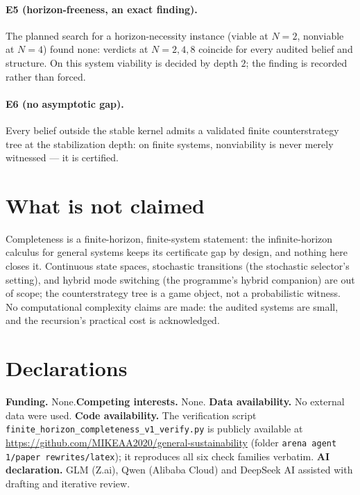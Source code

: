 \documentclass[10pt,twocolumn]{article}
\theoremstyle{definition}
\begin{document}
\paragraph{E5 (horizon-freeness, an exact finding).} The planned search for
a horizon-necessity instance (viable at $N=2$, nonviable at $N=4$) found
none: verdicts at $N=2,4,8$ coincide for every audited belief and
structure. On this system viability is decided by depth $2$; the finding
is recorded rather than forced.

\paragraph{E6 (no asymptotic gap).} Every belief outside the stable kernel
admits a validated finite counterstrategy tree at the stabilization depth:
on finite systems, nonviability is never merely witnessed --- it is
certified.

\section{What is not claimed}

Completeness is a finite-horizon, finite-system statement: the
infinite-horizon calculus for general systems keeps its certificate gap by
design, and nothing here closes it. Continuous state spaces, stochastic
transitions (the stochastic selector's setting), and hybrid mode switching
(the programme's hybrid companion) are out of scope; the counterstrategy
tree is a game object, not a probabilistic witness. No computational
complexity claims are made: the audited systems are small, and the
recursion's practical cost is acknowledged.


\section*{Declarations}
\textbf{Funding.} None.\quad \textbf{Competing interests.} None.\quad
\textbf{Data availability.} No external data were used.\quad
\textbf{Code availability.} The verification script
\texttt{finite\_horizon\_completeness\_v1\_verify.py} is publicly available at
\url{https://github.com/MIKEAA2020/general-sustainability} (folder
\texttt{arena agent 1/paper rewrites/latex}); it reproduces all six check
families verbatim.\quad
\textbf{AI declaration.} GLM (Z.ai), Qwen (Alibaba Cloud) and DeepSeek AI
assisted with drafting and iterative review.
\end{document}
